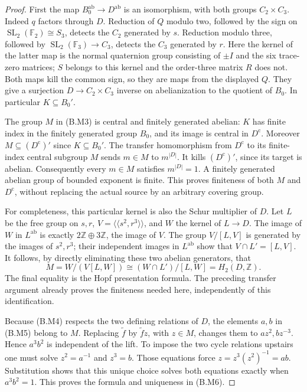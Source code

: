 \begin{proof}
First the map $B_0^{\mathrm{ab}}\to D^{\mathrm{ab}}$ is an
isomorphism, with both groups $C_2\times C_3$.  Indeed $q$
factors through $D$.  Reduction of $Q$ modulo two, followed by
the sign on $\operatorname{SL}_2(\mathbb F_2)\cong S_3$, detects
the $C_2$ generated by $s$.  Reduction modulo three, followed
by $\operatorname{SL}_2(\mathbb F_3)\to C_3$, detects the $C_3$
generated by $r$.  Here the kernel of the latter map is the
normal quaternion group consisting of $\pm I$ and the six
trace-zero matrices; $S$ belongs to this kernel and the
order-three matrix $R$ does not.  Both maps kill the common
sign, so they are maps from the displayed $Q$.  They give a
surjection $D\to C_2\times C_3$ inverse on abelianization to
the quotient of $B_0$.  In particular $K\subseteq B_0'$.

The group $M$ in (B.M3) is central and finitely generated
abelian: $K$ has finite index in the finitely generated group
$B_0$, and its image is central in $D^{\mathrm c}$.  Moreover
$M\subseteq(D^{\mathrm c})'$ since $K\subseteq B_0'$.  The
transfer homomorphism from $D^{\mathrm c}$ to its finite-index
central subgroup $M$ sends $m\in M$ to $m^{|D|}$.  It kills
$(D^{\mathrm c})'$, since its target is abelian.  Consequently
every $m\in M$ satisfies $m^{|D|}=1$.  A finitely generated
abelian group of bounded exponent is finite.  This proves
finiteness of both $M$ and $D^{\mathrm c}$, without replacing
the actual source by an arbitrary covering group.

For completeness, this particular kernel is also the Schur
multiplier of $D$.  Let $L$ be the free group on $s,r$,
$V=\langle\!\langle s^2,r^3\rangle\!\rangle$, and $W$ the
kernel of $L\to D$.  The image of $W$ in $L^{\mathrm{ab}}$
is exactly $2\mathbb Z\oplus3\mathbb Z$, the image of $V$.
The group $V/[L,V]$ is generated by the images of $s^2,r^3$;
their independent images in $L^{\mathrm{ab}}$ show that
$V\cap L'=[L,V]$.  It follows, by directly eliminating these
two abelian generators, that
\[
 M= W/(V[L,W])
   \cong (W\cap L')/[L,W]=H_2(D,\mathbb Z).      \tag{B.M7}
\]
The final equality is the Hopf presentation formula.  The
preceding transfer argument already proves the finiteness
needed here, independently of this identification.

Because (B.M4) respects the two defining relations of $D$,
the elements $a,b$ in (B.M5) belong to $M$.  Replacing
$\widetilde f$ by $\widetilde f z$, with $z\in M$, changes
them to $az^2,bz^{-3}$.  Hence $a^3b^2$ is independent of
the lift.  To impose the two cycle relations upstairs one
must solve $z^2=a^{-1}$ and $z^3=b$.  Those equations force
$z=z^3(z^2)^{-1}=ab$.  Substitution shows that this unique
choice solves both equations exactly when $a^3b^2=1$.
This proves the formula and uniqueness in (B.M6).


\end{proof}

